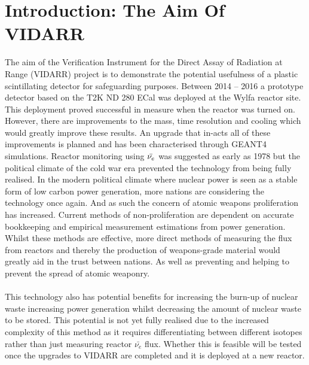 
\chapter{Introduction: The Aim Of VIDARR} \label{Chap:theAimOfVidarr} %
The aim of the Verification Instrument for the Direct Assay of Radiation at Range (VIDARR) project is to demonstrate the potential usefulness of a plastic scintillating detector for safeguarding purposes. Between 2014 -- 2016 a prototype detector based on the T2K ND 280 ECal \cite{Allan_2013} was deployed at the Wylfa reactor site. This deployment proved successful in measure when the reactor was turned on. However, there are improvements to the mass, time resolution and cooling which would greatly improve these results. An upgrade that in-acts all of these improvements is planned and has been characterised through GEANT4 \cite{Agostinelli:2002hh} simulations. Reactor monitoring using $\Bar{\nu_e}$ was suggested as early as 1978 \cite{Borovoi_1978} but the political climate of the cold war era prevented the technology from being fully realised. In the modern political climate where nuclear power is seen as a stable form of low carbon power generation, more nations are considering the technology once again. And as such the concern of atomic weapons proliferation has increased. Current methods of non-proliferation are dependent on accurate bookkeeping and empirical measurement estimations from power generation. Whilst these methods are effective, more direct methods of measuring the flux from reactors and thereby the production of weapons-grade material would greatly aid in the trust between nations. As well as preventing and helping to prevent the spread of atomic weaponry. 
\\\\This technology also has potential benefits for increasing the burn-up of nuclear waste increasing power generation whilst decreasing the amount of nuclear waste to be stored. This potential is not yet fully realised due to the increased complexity of this method as it requires differentiating between different isotopes rather than just measuring reactor $\bar{\nu_e}$ flux. Whether this is feasible will be tested once the upgrades to VIDARR are completed and it is deployed at a new reactor.  

